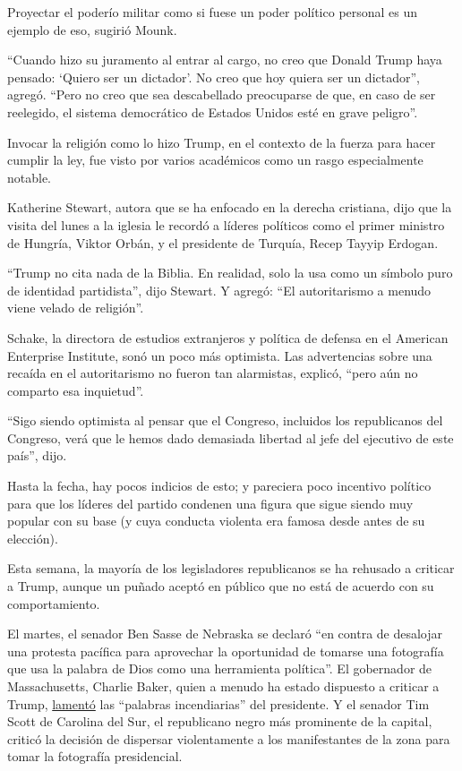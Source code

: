 Proyectar el poderío militar como si fuese un poder político personal es
un ejemplo de eso, sugirió Mounk.

``Cuando hizo su juramento al entrar al cargo, no creo que Donald Trump
haya pensado: `Quiero ser un dictador'. No creo que hoy quiera ser un
dictador'', agregó. ``Pero no creo que sea descabellado preocuparse de
que, en caso de ser reelegido, el sistema democrático de Estados Unidos
esté en grave peligro''.

Invocar la religión como lo hizo Trump, en el contexto de la fuerza para
hacer cumplir la ley, fue visto por varios académicos como un rasgo
especialmente notable.

Katherine Stewart, autora que se ha enfocado en la derecha cristiana,
dijo que la visita del lunes a la iglesia le recordó a líderes políticos
como el primer ministro de Hungría, Viktor Orbán, y el presidente de
Turquía, Recep Tayyip Erdogan.

``Trump no cita nada de la Biblia. En realidad, solo la usa como un
símbolo puro de identidad partidista'', dijo Stewart. Y agregó: ``El
autoritarismo a menudo viene velado de religión''.

Schake, la directora de estudios extranjeros y política de defensa en el
American Enterprise Institute, sonó un poco más optimista. Las
advertencias sobre una recaída en el autoritarismo no fueron tan
alarmistas, explicó, ``pero aún no comparto esa inquietud''.

``Sigo siendo optimista al pensar que el Congreso, incluidos los
republicanos del Congreso, verá que le hemos dado demasiada libertad al
jefe del ejecutivo de este país'', dijo.

Hasta la fecha, hay pocos indicios de esto; y pareciera poco incentivo
político para que los líderes del partido condenen una figura que sigue
siendo muy popular con su base (y cuya conducta violenta era famosa
desde antes de su elección).

Esta semana, la mayoría de los legisladores republicanos se ha rehusado
a criticar a Trump, aunque un puñado aceptó en público que no está de
acuerdo con su comportamiento.

El martes, el senador Ben Sasse de Nebraska se declaró ``en contra de
desalojar una protesta pacífica para aprovechar la oportunidad de
tomarse una fotografía que usa la palabra de Dios como una herramienta
política''. El gobernador de Massachusetts, Charlie Baker, quien a
menudo ha estado dispuesto a criticar a Trump,
\href{https://edition.cnn.com/2020/06/01/politics/charlie-baker-donald-trump-governor-call/index.html}{lamentó}
las ``palabras incendiarias'' del presidente. Y el senador Tim Scott de
Carolina del Sur, el republicano negro más prominente de la capital,
criticó la decisión de dispersar violentamente a los manifestantes de la
zona para tomar la fotografía presidencial.

